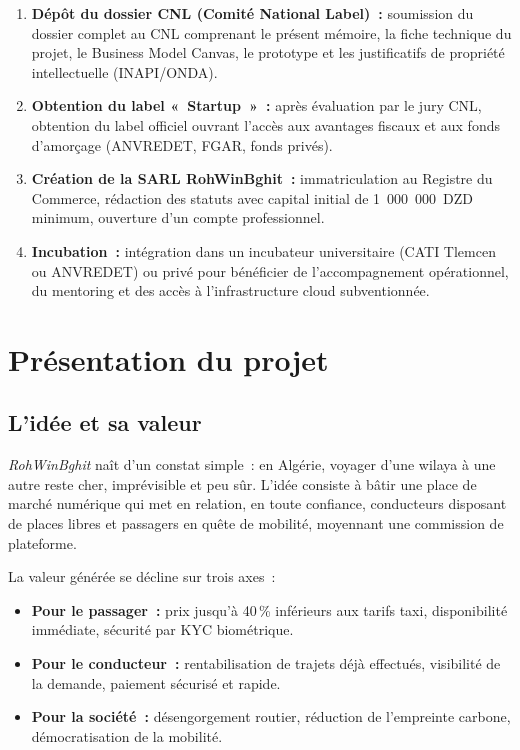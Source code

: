 \documentclass[12pt, a4paper, oneside]{report}
\begin{document}
\begin{enumerate}
  \item \textbf{Dépôt du dossier CNL (Comité National Label)~:} soumission du dossier complet au CNL comprenant le présent mémoire, la fiche technique du projet, le Business Model Canvas, le prototype et les justificatifs de propriété intellectuelle (INAPI/ONDA).
  \item \textbf{Obtention du label «~Startup~»~:} après évaluation par le jury CNL, obtention du label officiel ouvrant l'accès aux avantages fiscaux et aux fonds d'amorçage (ANVREDET, FGAR, fonds privés).
  \item \textbf{Création de la SARL RohWinBghit~:} immatriculation au Registre du Commerce, rédaction des statuts avec capital initial de 1~000~000~DZD minimum, ouverture d'un compte professionnel.
  \item \textbf{Incubation~:} intégration dans un incubateur universitaire (CATI Tlemcen ou ANVREDET) ou privé pour bénéficier de l'accompagnement opérationnel, du mentoring et des accès à l'infrastructure cloud subventionnée.
\end{enumerate}

\section{Présentation du projet}

\subsection{L'idée et sa valeur}

\textit{RohWinBghit} naît d'un constat simple~: en Algérie, voyager d'une wilaya à une autre reste cher, imprévisible et peu sûr. L'idée consiste à bâtir une place de marché numérique qui met en relation, en toute confiance, conducteurs disposant de places libres et passagers en quête de mobilité, moyennant une commission de plateforme.

La valeur générée se décline sur trois axes~:
\begin{itemize}
  \item \textbf{Pour le passager~:} prix jusqu'à 40\,\% inférieurs aux tarifs taxi, disponibilité immédiate, sécurité par KYC biométrique.
  \item \textbf{Pour le conducteur~:} rentabilisation de trajets déjà effectués, visibilité de la demande, paiement sécurisé et rapide.
  \item \textbf{Pour la société~:} désengorgement routier, réduction de l'empreinte carbone, démocratisation de la mobilité.
\end{itemize}
\end{document}
